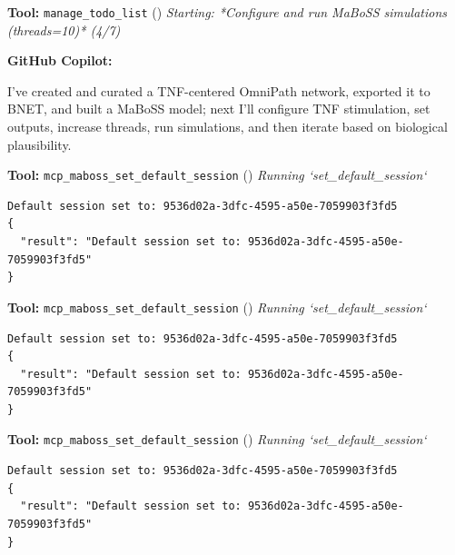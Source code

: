 \documentclass[11pt,a4paper]{article}
\begin{document}
\begin{toolokbox}
\textbf{Tool:} \texttt{manage\_todo\_list} (\checkmark)
\textit{Starting: *Configure and run MaBoSS simulations (threads=10)* (4/7)}
\end{toolokbox}
\begin{copilotbox}
\textbf{GitHub Copilot:}

I’ve created and curated a TNF-centered OmniPath network, exported it to BNET, and built a MaBoSS model; next I’ll configure TNF stimulation, set outputs, increase threads, run simulations, and then iterate based on biological plausibility.

\end{copilotbox}
\begin{toolokbox}
\textbf{Tool:} \texttt{mcp\_maboss\_set\_default\_session} (\checkmark)
\textit{Running `set\_default\_session`}
\begin{lstlisting}
Default session set to: 9536d02a-3dfc-4595-a50e-7059903f3fd5
{
  "result": "Default session set to: 9536d02a-3dfc-4595-a50e-7059903f3fd5"
}
\end{lstlisting}
\end{toolokbox}
\begin{toolokbox}
\textbf{Tool:} \texttt{mcp\_maboss\_set\_default\_session} (\checkmark)
\textit{Running `set\_default\_session`}
\begin{lstlisting}
Default session set to: 9536d02a-3dfc-4595-a50e-7059903f3fd5
{
  "result": "Default session set to: 9536d02a-3dfc-4595-a50e-7059903f3fd5"
}
\end{lstlisting}
\end{toolokbox}
\begin{toolokbox}
\textbf{Tool:} \texttt{mcp\_maboss\_set\_default\_session} (\checkmark)
\textit{Running `set\_default\_session`}
\begin{lstlisting}
Default session set to: 9536d02a-3dfc-4595-a50e-7059903f3fd5
{
  "result": "Default session set to: 9536d02a-3dfc-4595-a50e-7059903f3fd5"
}
\end{lstlisting}
\end{toolokbox}
\end{document}
